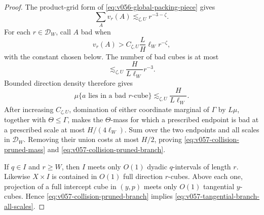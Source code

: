 \documentclass[10pt]{article}
\begin{document}
\begin{proof}
The product-grid form of \eqref{eq:v056-global-packing-piece} gives
\[
\sum_Av_r(A)
\lesssim_{\zeta,U}
r^{-3-\zeta}.
\]
For each \(r\in\mathcal D_W\), call \(A\) bad when
\[
v_r(A)>C_{\zeta,U}\frac{L}{H}\ell_Wr^{-\zeta},
\]
with the constant chosen below.  The number of bad cubes is at most
\[
\lesssim_{\zeta,U}
\frac{H}{L\ell_W}r^{-3}.
\]
Bounded direction density therefore gives
\[
\mu\{a\text{ lies in a bad }r\text{-cube}\}
\lesssim_{\zeta,U}
\frac{H}{L\ell_W}.
\]
After increasing \(C_{\zeta,U}\), domination of either coordinate marginal of \(\Gamma\) by
\(L\mu\), together with \(\Theta\le\Gamma\), makes the \(\Theta\)-mass for which a prescribed
endpoint is bad at a prescribed scale at most \(H/(4\ell_W)\).  Sum over the two endpoints and all
scales in \(\mathcal D_W\).  Removing their union costs at most \(H/2\), proving
\eqref{eq:v057-collision-pruned-mass} and \eqref{eq:v057-collision-pruned-branch}.

If \(q\in I\) and \(r\ge W\), then \(I\) meets only \(O(1)\) dyadic \(q\)-intervals of length
\(r\).  Likewise \(X\times I\) is contained in \(O(1)\) full direction \(r\)-cubes.  Above each
one, projection of a full intercept cube in \((y,p)\) meets only \(O(1)\) tangential
\(y\)-cubes.  Hence \eqref{eq:v057-collision-pruned-branch} implies
\eqref{eq:v057-tangential-branch-all-scales}.
\end{proof}
\end{document}
